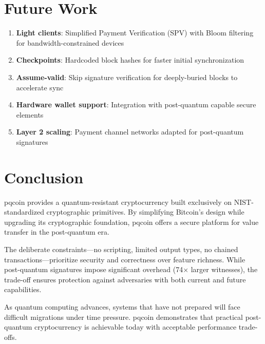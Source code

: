 \documentclass[11pt,a4paper]{article}
\begin{document}
\section{Future Work}

\begin{enumerate}
    \item \textbf{Light clients}: Simplified Payment Verification (SPV) with Bloom filtering for bandwidth-constrained devices

    \item \textbf{Checkpoints}: Hardcoded block hashes for faster initial synchronization

    \item \textbf{Assume-valid}: Skip signature verification for deeply-buried blocks to accelerate sync

    \item \textbf{Hardware wallet support}: Integration with post-quantum capable secure elements

    \item \textbf{Layer 2 scaling}: Payment channel networks adapted for post-quantum signatures
\end{enumerate}

\section{Conclusion}

pqcoin provides a quantum-resistant cryptocurrency built exclusively on NIST-standardized cryptographic primitives. By simplifying Bitcoin's design while upgrading its cryptographic foundation, pqcoin offers a secure platform for value transfer in the post-quantum era.

The deliberate constraints---no scripting, limited output types, no chained transactions---prioritize security and correctness over feature richness. While post-quantum signatures impose significant overhead (74$\times$ larger witnesses), the trade-off ensures protection against adversaries with both current and future capabilities.

As quantum computing advances, systems that have not prepared will face difficult migrations under time pressure. pqcoin demonstrates that practical post-quantum cryptocurrency is achievable today with acceptable performance trade-offs.
\end{document}
